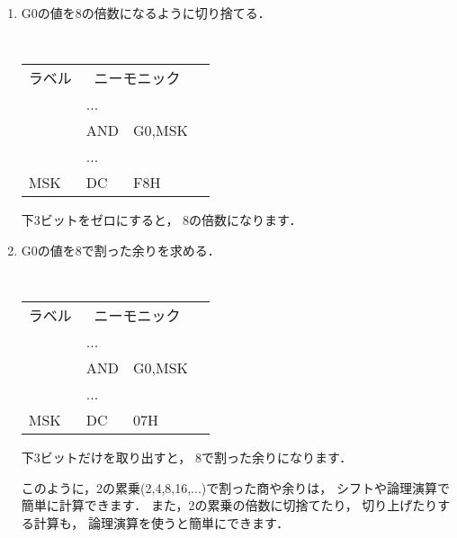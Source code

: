 \begin{description}
\begin{enumerate}
\begin{center}
\epsfxsize=5cm
\end{center}

\item G0の値を8の倍数になるように切り捨てる．

\begin{center}
{\small\tt
\begin{tabular}{|l|l l|l}
\cline{1-3}
ラベル & \multicolumn{2}{|c|}{ニーモニック} & \\
\cline{1-3}
    & ...  &        & \\
    & AND  & G0,MSK & \\
    & ...  &        & \\
MSK & DC   & F8H    & \\
\cline{1-3}
\end{tabular}
}
\end{center}

下3ビットをゼロにすると，
8の倍数になります．

\item G0の値を8で割った余りを求める．

\begin{center}
{\small\tt
\begin{tabular}{|l|l l|l}
\cline{1-3}
ラベル & \multicolumn{2}{|c|}{ニーモニック} & \\
\cline{1-3}
    & ...  &        & \\
    & AND  & G0,MSK & \\
    & ...  &        & \\
MSK & DC   & 07H    & \\
\cline{1-3}
\end{tabular}
}
\end{center}

下3ビットだけを取り出すと，
8で割った余りになります．

\vspace{0.3cm}

このように，2の累乗(2,4,8,16,...)で割った商や余りは，
シフトや論理演算で簡単に計算できます．
また，2の累乗の倍数に切捨てたり，
切り上げたりする計算も，
論理演算を使うと簡単にできます．

\end{enumerate}
\end{description}

\vfill
\begin{center}
\end{center}

